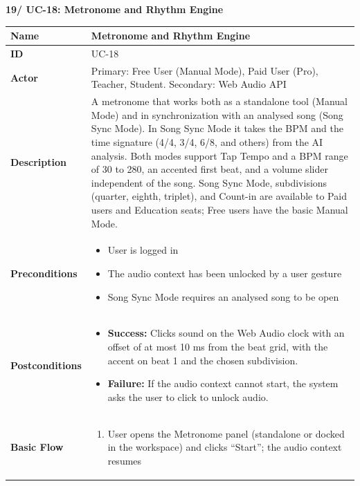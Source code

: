 \documentclass[a4paper]{article}
\newlength{\ucLeft}
\begin{document}
\vspace{0.5em}
\noindent\textbf{19/ UC-18: Metronome and Rhythm Engine}

\begin{longtable}{|>{\bfseries}p{\ucLeft}|p{\dimexpr\linewidth-\ucLeft-2\tabcolsep-2\arrayrulewidth}|}
\hline
Name & Metronome and Rhythm Engine \\ \hline
ID & UC-18 \\ \hline
Actor & Primary: Free User (Manual Mode), Paid User (Pro), Teacher, Student. Secondary: Web Audio API \\ \hline
Description & A metronome that works both as a standalone tool (Manual Mode) and in synchronization with an analysed song (Song Sync Mode). In Song Sync Mode it takes the BPM and the time signature (4/4, 3/4, 6/8, and others) from the AI analysis. Both modes support Tap Tempo and a BPM range of 30 to 280, an accented first beat, and a volume slider independent of the song. Song Sync Mode, subdivisions (quarter, eighth, triplet), and Count-in are available to Paid users and Education seats; Free users have the basic Manual Mode. \\ \hline
Preconditions &
\begin{itemize}[leftmargin=1em, nosep, topsep=2pt, partopsep=0pt, parsep=0pt, after=\strut]
    \item User is logged in
    \item The audio context has been unlocked by a user gesture
    \item Song Sync Mode requires an analysed song to be open
\end{itemize}
\\ \hline
Postconditions &
\begin{itemize}[leftmargin=1em, nosep, topsep=2pt, partopsep=0pt, parsep=0pt, after=\strut]
    \item \textbf{Success:} Clicks sound on the Web Audio clock with an offset of at most 10 ms from the beat grid, with the accent on beat 1 and the chosen subdivision.
    \item \textbf{Failure:} If the audio context cannot start, the system asks the user to click to unlock audio.
\end{itemize}
\\ \hline
Basic Flow &
\begin{enumerate}[leftmargin=1.5em, nosep, topsep=2pt, partopsep=0pt, parsep=0pt, after=\strut]
    \item User opens the Metronome panel (standalone or docked in the workspace) and clicks ``Start''; the audio context resumes

\end{enumerate}
\end{longtable}
\end{document}
